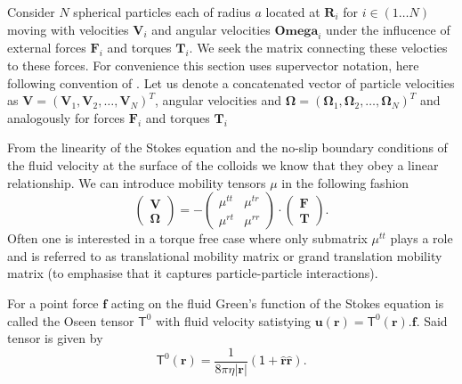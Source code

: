 \documentclass{doctoral}
\newcommand{\mm}[1]{\bm{\mathsf{#1}}} %
\begin{document}
Consider $N$ spherical particles each of radius $a$ located at $\bm{R}_i$ for $i \in (1 \dots N)$ moving with velocities $\bm{V}_i$ and angular velocities $\bm{Omega}_i$ under the influcence of external forces $\bm{F}_i$ and torques $\bm{T}_i$.
We seek the matrix connecting these velocties to these forces.
For convenience this section uses supervector notation, here following convention of \cite{Nagele_2013}.
Let us denote a concatenated vector of particle velocities as $\bm{V} = (\bm{V}_1,\bm{V}_2,\dots,\bm{V}_N)^{T}$, angular velocities and $\bm{\Omega} = (\bm{\Omega}_1,\bm{\Omega}_2,\dots,\bm{\Omega}_N)^{T}$ and analogously for forces $\bm{F}_i$ and torques $\bm{T}_i$ 

From the linearity of the Stokes equation and the no-slip boundary conditions of the fluid velocity at the surface of the colloids we know that they obey a linear relationship.
We can introduce mobility tensors $\mm{\mu}$ in the following fashion
\begin{equation}
    \begin{pmatrix}
        \bm{V} \\
        \bm{\Omega}
    \end{pmatrix}
    = -
    \begin{pmatrix}
        \mm{\mu}^{tt} & \mm{\mu}^{tr} \\
        \mm{\mu}^{rt} & \mm{\mu}^{rr}
    \end{pmatrix}
    \cdot
    \begin{pmatrix}
        \bm{F} \\
        \bm{T}
    \end{pmatrix}
    .
    \label{eqn:mobility-matrix-definition}
\end{equation}
Often one is interested in a torque free case where only submatrix $\mm{\mu}^{tt}$ plays a role and is referred to as translational mobility matrix or grand translation mobility matrix (to emphasise that it captures particle-particle interactions).

For a point force $\bm{f}$ acting on the fluid Green's function of the Stokes equation is called the Oseen tensor $\mm{T}^0$ with fluid velocity satistying $\bm{u}(\bm{r}) = \mm{T}^{0}(\bm{r}).
    \bm{f}$.
Said tensor is given by
\begin{equation}
    \mm{T}^{0}(\bm{r}) = \frac{1}{8\pi\eta |\bm{r}|} \left( \mm{1} + \bm{\hat{r}}\bm{\hat{r}}\right).
\end{equation}
\end{document}
